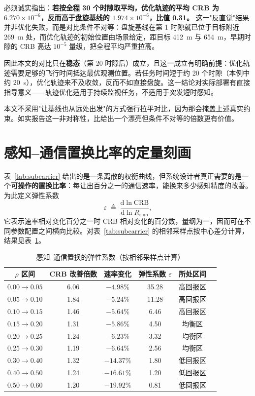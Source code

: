 必须诚实指出：\textbf{若按全程 30 个时隙取平均，优化轨迹的平均 CRB 为 $6.270\times10^{-6}$，反而高于盘旋基线的 $1.974\times10^{-6}$，比值 0.31。} 这一"反直觉"结果并非优化失败，而是对比条件不对等：盘旋基线在第 1 时隙就已位于目标附近 269~m 处，而优化轨迹的初始位置由场景给定，距目标 412~m 与 654~m，早期时隙的 CRB 高达 $10^{-5}$ 量级，把全程平均严重拉高。

因此本文的对比只在\textbf{稳态}（第 20 时隙后）成立，且这一成立有明确前提：优化轨迹需要足够的飞行时间抵达最优观测位置。若任务时间短于约 20 个时隙（本例中约 20~s），优化轨迹来不及收敛，反而不如直接盘旋。这一结论对实际部署有直接指导意义——轨迹优化适用于持续监视任务，不适用于突发短时感知。

本文不采用"让基线也从远处出发"的方式强行拉平对比，因为那会掩盖上述真实约束。如实报告这一非对称性，比给出一个漂亮但条件不对等的倍数更有价值。

\section{感知--通信置换比率的定量刻画}
\label{sec:exp_elasticity}

表~\ref{tab:subcarrier} 给出的是一条离散的权衡曲线，但系统设计者真正需要的是一个\textbf{可操作的置换比率}：每让出百分之一的通信速率，能换来多少感知精度的改善。为此定义弹性系数
\begin{equation}
  \varepsilon \;\triangleq\; \frac{\mathrm{d}\ln \mathrm{CRB}}{\mathrm{d}\ln R_{\mathrm{sum}}},
  \label{eq:elasticity}
\end{equation}
它表示速率相对变化百分之一时 CRB 相对变化的百分数，量纲为一，因而可在不同参数配置之间横向比较。对表~\ref{tab:subcarrier} 的相邻采样点按中心差分计算，结果见表~\ref{tab:elasticity}。

\begin{table}[htbp]
  \centering
  \caption{感知--通信置换的弹性系数（按相邻采样点计算）}
  \label{tab:elasticity}
  \begin{tabular}{cccccc}
    \toprule
    $\rho$ 区间 & CRB 改善倍数 & 速率变化 & 弹性系数 $\varepsilon$ & 所处区间 \\
    \midrule
    $0.00\to0.05$ & 6.06 & $-4.98\%$ & 35.28 & 高回报区 \\
    $0.05\to0.10$ & 1.84 & $-5.24\%$ & 11.28 & 高回报区 \\
    $0.10\to0.15$ & 1.46 & $-5.64\%$ & 6.46  & 高回报区 \\
    $0.15\to0.20$ & 1.31 & $-5.86\%$ & 4.50  & 均衡区 \\
    $0.20\to0.25$ & 1.24 & $-6.23\%$ & 3.32  & 均衡区 \\
    $0.25\to0.30$ & 1.19 & $-6.64\%$ & 2.56  & 均衡区 \\
    $0.30\to0.40$ & 1.32 & $-14.37\%$ & 1.80 & 低回报区 \\
    $0.40\to0.50$ & 1.24 & $-16.61\%$ & 1.20 & 低回报区 \\
    $0.50\to0.60$ & 1.20 & $-19.92\%$ & 0.81 & 低回报区 \\
    \bottomrule
  \end{tabular}
\end{table}

